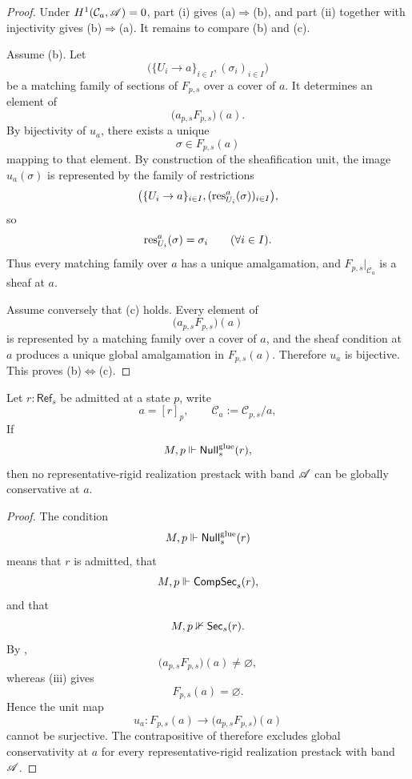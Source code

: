 \begin{proof}
Under $H^1(\mathcal C_a,\mathscr{A})=0$, part \textup{(i)} gives \textup{(a)}$\Rightarrow$\textup{(b)}, and part \textup{(ii)} together with injectivity gives \textup{(b)}$\Rightarrow$\textup{(a)}. It remains to compare \textup{(b)} and \textup{(c)}.

Assume \textup{(b)}. Let
\[
\bigl(\{U_i\to a\}_{i\in I},(\sigma_i)_{i\in I}\bigr)
\]
be a matching family of sections of $F_{p,s}$ over a cover of $a$. It determines an element of
\[
\bigl(a_{p,s}F_{p,s}\bigr)(a).
\]
By bijectivity of $u_a$, there exists a unique
\[
\sigma\in F_{p,s}(a)
\]
mapping to that element. By construction of the sheafification unit, the image $u_a(\sigma)$ is represented by the family of restrictions
\[
\bigl(\{U_i\to a\}_{i\in I},(\mathrm{res}_{U_i}^a(\sigma))_{i\in I}\bigr),
\]
so
\[
\mathrm{res}_{U_i}^a(\sigma)=\sigma_i
\qquad
(\forall i\in I).
\]
Thus every matching family over $a$ has a unique amalgamation, and $F_{p,s}|_{\mathcal C_a}$ is a sheaf at $a$.

Assume conversely that \textup{(c)} holds. Every element of
\[
\bigl(a_{p,s}F_{p,s}\bigr)(a)
\]
is represented by a matching family over a cover of $a$, and the sheaf condition at $a$ produces a unique global amalgamation in $F_{p,s}(a)$. Therefore $u_a$ is bijective. This proves \textup{(b)}$\Leftrightarrow$\textup{(c)}.
\end{proof}

\begin{corollary}\label{cor:no-rigid-gluing-null}
Let $r:\mathsf{Ref}_s$ be admitted at a state $p$, write
\[
a=[r]_p,
\qquad
\mathcal C_a:=\mathcal C_{p,s}/a,
\]
If
\[
M,p\Vdash \mathsf{Null}^{\mathrm{glue}}_s(r),
\]
then no representative-rigid realization prestack with band $\mathscr{A}$ can be globally conservative at $a$.
\end{corollary}

\begin{proof}
The condition
\[
M,p\Vdash \mathsf{Null}^{\mathrm{glue}}_s(r)
\]
means that $r$ is admitted, that
\[
M,p\Vdash \mathsf{CompSec}_s(r),
\]
and that
\[
M,p\nVdash \mathsf{Sec}_s(r).
\]
By ,
\[
\bigl(a_{p,s}F_{p,s}\bigr)(a)\neq\varnothing,
\]
whereas (iii) gives
\[
F_{p,s}(a)=\varnothing.
\]
Hence the unit map
\[
u_a:F_{p,s}(a)\to \bigl(a_{p,s}F_{p,s}\bigr)(a)
\]
cannot be surjective. The contrapositive of  therefore excludes global conservativity at $a$ for every representative-rigid realization prestack with band $\mathscr{A}$.
\end{proof}

